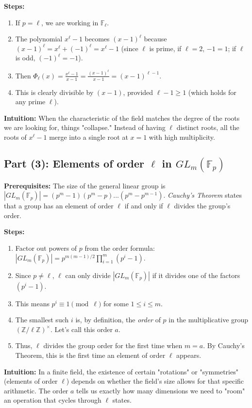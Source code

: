 \begin{solution}
\textbf{Steps:}
\begin{enumerate}
    \item If $p = \ell$, we are working in $\mathbb{F}_\ell$.
    \item The polynomial $x^\ell - 1$ becomes $(x-1)^\ell$ because $(x-1)^\ell = x^\ell + (-1)^\ell = x^\ell - 1$ (since $\ell$ is prime, if $\ell=2$, $-1=1$; if $\ell$ is odd, $(-1)^\ell = -1$).
    \item Then $\Phi_\ell(x) = \frac{x^\ell - 1}{x - 1} = \frac{(x-1)^\ell}{x-1} = (x-1)^{\ell-1}$.
    \item This is clearly divisible by $(x-1)$, provided $\ell-1 \geq 1$ (which holds for any prime $\ell$).
\end{enumerate}

\textbf{Intuition:}
When the characteristic of the field matches the degree of the roots we are looking for, things "collapse." Instead of having $\ell$ distinct roots, all the roots of $x^\ell-1$ merge into a single root at $x=1$ with high multiplicity.

\par\vspace{1.5em}

\subsection*{Part (3): Elements of order $\ell$ in $GL_m(\mathbb{F}_p)$}

\textbf{Prerequisites:} 
The size of the general linear group is $|GL_m(\mathbb{F}_p)| = (p^m-1)(p^m-p)\dots(p^m-p^{m-1})$. \textit{Cauchy's Theorem} states that a group has an element of order $\ell$ if and only if $\ell$ divides the group's order.

\textbf{Steps:}
\begin{enumerate}
    \item Factor out powers of $p$ from the order formula: $|GL_m(\mathbb{F}_p)| = p^{m(m-1)/2} \prod_{i=1}^m (p^i - 1)$.
    \item Since $p \neq \ell$, $\ell$ can only divide $|GL_m(\mathbb{F}_p)|$ if it divides one of the factors $(p^i - 1)$.
    \item This means $p^i \equiv 1 \pmod{\ell}$ for some $1 \leq i \leq m$.
    \item The smallest such $i$ is, by definition, the \textit{order} of $p$ in the multiplicative group $(\mathbb{Z}/\ell\mathbb{Z})^\times$. Let's call this order $a$.
    \item Thus, $\ell$ divides the group order for the first time when $m = a$. By Cauchy's Theorem, this is the first time an element of order $\ell$ appears.
\end{enumerate}

\textbf{Intuition:}
In a finite field, the existence of certain "rotations" or "symmetries" (elements of order $\ell$) depends on whether the field's size allows for that specific arithmetic. The order $a$ tells us exactly how many dimensions we need to "room" an operation that cycles through $\ell$ states.
\end{solution}

